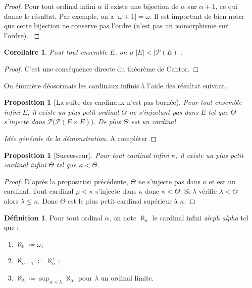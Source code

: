 \documentclass{article}
\theoremstyle{definition}
\newtheorem{definition}[subsubsection]{Définition}
\theoremstyle{plain}
\newtheorem{proposition}[subsubsection]{Proposition}
\theoremstyle{plain}
\newtheorem{corollary}[subsubsection]{Corollaire}
\theoremstyle{plain}
\theoremstyle{plain}
\theoremstyle{plain}
\begin{document}
\begin{proof}
	Pour tout ordinal infini \( \alpha \) il existe une bijection de \( \alpha \) sur \( \alpha + 1 \), ce qui donne le résultat. Par exemple, on a \( |\omega + 1| = \omega \). Il est important de bien noter que cette bijection ne conserve pas l'ordre (n'est pas un isomorphisme sur l'ordre). \cite{gowers2010ordinals}
\end{proof}

\begin{corollary}
	Pout tout ensemble \( E \), on a \( |E| < |\mathcal{P}(E)| \).
\end{corollary}
\begin{proof}
	C'est une conséquence directe du théorème de Cantor.
\end{proof}
\par On énumère déosormais les cardinaux infinis à l'aide des résultat suivant.

\begin{proposition}[La suite des cardinaux n'est pas bornée]
	Pour tout ensemble infini \( E \), il existe un plus petit ordinal \( \Theta \) ne s'injectant pas dans \( E \) tel que \( \Theta \) s'injecte dans \( \mathcal{P(\mathcal{P}}(E \times E))\). De plus \( \Theta \) est un cardinal.
\end{proposition}
\begin{proof}[Idée générale de la démonstration]
	A compléter
\end{proof}

\begin{proposition}[Successeur]
	Pour tout cardinal infini \( \kappa \), il existe un plus petit cardinal infini \( \Theta \) tel que \( \kappa < \Theta \).
\end{proposition}
\begin{proof}
	D'après la proposition précédente, \( \Theta \) ne s'injecte pas dans \( \kappa \) et est un cardinal. Tout cardinal \( \mu < \kappa \) s'injecte dans \( \kappa \) donc \( \kappa < \Theta \). Si \( \lambda \) vérifie \( \lambda <  \Theta \) alors \( \lambda \le \kappa \). Donc \( \Theta \) est le plus petit cardinal supérieur à \( \kappa \).  
\end{proof}

\begin{definition}
Pour tout ordinal \( \alpha \), on note \( \aleph_{\alpha} \) le cardinal infini \textit{aleph alpha} tel que :
	\begin{enumerate}[label = (\roman*) ]
		\item \( \aleph_{0} \coloneqq \omega \);
		\item \( \aleph_{\alpha + 1} \coloneqq \aleph_{\alpha}^{+} \);
		\item \( \aleph_{\lambda} \coloneqq \sup_{\alpha < \lambda} \aleph_{\alpha} \) pour \( \lambda \) un ordinal limite.
	\end{enumerate}
\end{definition}
\end{document}
